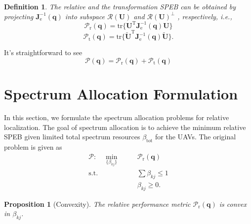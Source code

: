 \documentclass{IEEEtran}
\newtheorem{definition}{Definition}
\newtheorem{proposition}{Proposition}
\begin{document}
\begin{definition}\label{pro_2}
The relative and the transformation SPEB can be obtained by projecting $\mathbf{J}_{\text{e}}^{-1}(\mathbf{q})$ into subspace $\mathcal{R}(\mathbf{U})$ and $\mathcal{R}(\mathbf{U})^\perp$ \cite{AshMos:J08}, respectively, i.e.,
\begin{equation}\label{eq20}
\mathcal{P}_{\text{r}}(\mathbf{q})=\text{tr}\{\mathbf{U}^{\text{T}}\mathbf{J}_{\text{e}}^{-1}(\mathbf{q})\mathbf{U}\}
\end{equation}
\begin{equation}
\mathcal{P}_{\text{t}}(\mathbf{q})=\text{tr}\{\widetilde{\mathbf{U}}^{\text{T}}\mathbf{J}_{\text{e}}^{-1}(\mathbf{q})\widetilde{\mathbf{U}}\}.
\end{equation}
\end{definition}\label{pro_2}
It's straightforward to see
\begin{equation}
\mathcal{P}(\mathbf{q})=\mathcal{P}_{\text{r}}(\mathbf{q})+\mathcal{P}_{\text{t}}(\mathbf{q})
\end{equation}

\section{Spectrum Allocation Formulation}
In this section, we formulate the spectrum allocation problems for relative localization.
The goal of spectrum allocation is to achieve the minimum relative SPEB given limited total spectrum resources $\beta_{\text{tot}}$ for the UAVs.
The original problem is given as
\begin{eqnarray}
\mathscr{P}: \quad \min_{\{\beta_{kj}\}} \quad &&\mathcal{P}_{\text{r}}(\mathbf{q}) \nonumber \\
\text{s.t.}&&\sum \beta_{kj}\leq 1\\
&&\beta_{kj}\geq 0. \nonumber
\end{eqnarray}

\begin{proposition}[Convexity]\label{p1}
The relative performance metric $\mathcal{P}_{\text{r}}(\mathbf{q})$ is convex in $\beta_{kj}$.
\end{proposition}
\end{document}
